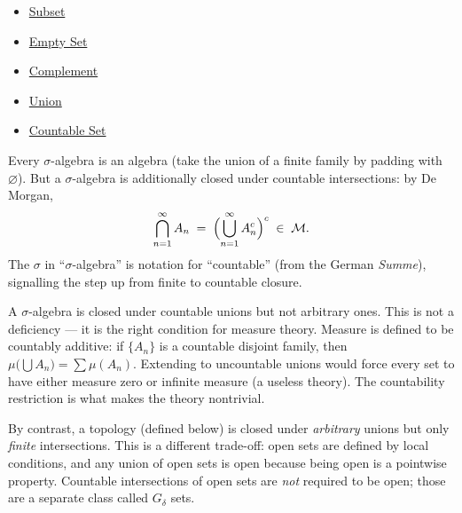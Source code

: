 \begin{dependencies}
\begin{itemize}
  \item \hyperref[def:subset]{Subset}
  \item \hyperref[def:empty-set]{Empty Set}
  \item \hyperref[def:complement]{Complement}
  \item \hyperref[def:union]{Union}
  \item \hyperref[def:countable]{Countable Set}
\end{itemize}
\end{dependencies}

\begin{remark*}
Every $\sigma$-algebra is an algebra (take the union of a finite family by
padding with $\varnothing$). But a $\sigma$-algebra is additionally closed
under countable intersections: by De Morgan,
\[
\bigcap_{n=1}^{\infty} A_n
\;=\;
\Bigl(\bigcup_{n=1}^{\infty} A_n^c\Bigr)^c
\;\in\; \mathcal{M}.
\]
The $\sigma$ in ``$\sigma$-algebra'' is notation for ``countable'' (from the
German \emph{Summe}), signalling the step up from finite to countable closure.
\end{remark*}

\begin{remark*}
A $\sigma$-algebra is closed under countable unions but not arbitrary ones.
This is not a deficiency — it is the right condition for measure theory.
Measure is defined to be countably additive: if $\{A_n\}$ is a countable
disjoint family, then $\mu\bigl(\bigcup A_n\bigr) = \sum \mu(A_n)$. Extending
to uncountable unions would force every set to have either measure zero or
infinite measure (a useless theory). The countability restriction is what makes
the theory nontrivial.

By contrast, a topology (defined below) is closed under \emph{arbitrary}
unions but only \emph{finite} intersections. This is a different trade-off:
open sets are defined by local conditions, and any union of open sets is open
because being open is a pointwise property. Countable intersections of open
sets are \emph{not} required to be open; those are a separate class called
$G_\delta$ sets.
\end{remark*}


